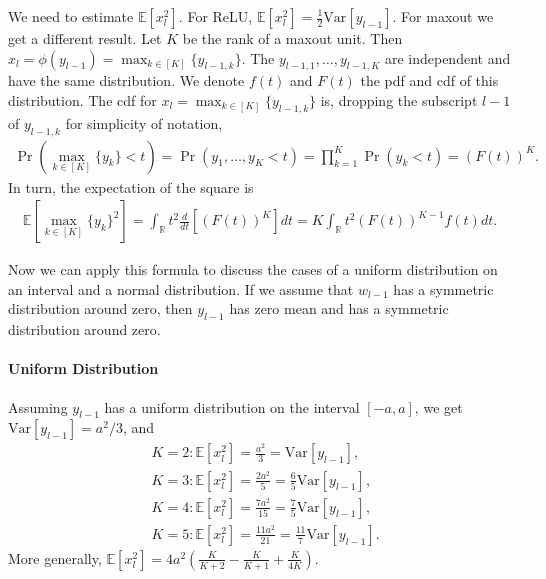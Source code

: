 \documentclass{article}
\theoremstyle{definition}
\newcommand{\var}{\mathrm{Var}}
\begin{document}
    We need to estimate $\mathbb{E}[x^2_l]$. 
    For ReLU, $\mathbb{E}[x_l^2] = \frac{1}{2} \var[y_{l-1}]$. 
    For maxout we get a different result. 
    Let $K$ be the rank of a maxout unit. 
    Then $x_l = \phi(y_{l-1}) = \max_{k \in [K]}\{y_{l-1,k}\}$.
    The $y_{l-1,1},\ldots, y_{l-1,K}$ are independent and have the same distribution.
    We denote $f(t)$ and $F(t)$ the pdf and cdf of this distribution.
    The cdf for $x_l = \max_{k\in[K]}\{y_{l-1,k}\}$ is, dropping the subscript $l-1$ of $y_{l-1,k}$ for simplicity of notation, 
    \begin{align*} 
        \Pr \left(\max_{k \in [K]}\{y_{k}\} < t \right) = \Pr \left( y_1,\ldots, y_K < t \right) = \prod_{k = 1}^K \Pr\left( y_k < t \right)= (F(t))^K. 
    \end{align*}
    In turn, the expectation of the square is 
    \begin{align*}
        \mathbb{E} \left[ \max_{k \in [K]}\{y_k\}^2 \right] = \int_{\mathbb{R}} t^2 \frac{d}{dt} \left[ \left( F(t) \right)^K \right] dt = K \int_{\mathbb{R}} t^2 \left( F(t) \right)^{K - 1} f(t) dt.
    \end{align*}
    
    Now we can apply this formula to discuss the cases of a uniform distribution on an interval and a normal distribution. If we assume that $w_{l - 1}$ has a symmetric distribution around zero, then $y_{l - 1}$ has zero mean and has a symmetric distribution around zero. 
    
    \paragraph{Uniform Distribution}
    Assuming $y_{l-1}$ has a uniform distribution on the interval $[-a, a]$, we get $\var[y_{l-1}] = a^2/3$, and 
    \begin{align*}
        &K = 2: \mathbb{E}[x_l^2] = \frac{a^2}{3} = \var[y_{l-1}],\\
        &K = 3: \mathbb{E}[x_l^2] = \frac{2 a^2}{5} =  \frac{6}{5}\var[y_{l-1}],\\
        &K = 4: \mathbb{E}[x_l^2] = \frac{7 a^2}{15} =  \frac{7}{5}\var[y_{l-1}],\\
        &K = 5: \mathbb{E}[x_l^2] = \frac{11 a^2}{21} =  \frac{11}{7}\var[y_{l-1}].
    \end{align*}
    More generally, $\mathbb{E}[x_l^2] = 4 a^2 (\frac{K}{K+2} - \frac{K}{K+1}+\frac{K}{4K})$. 
    
\end{document}
